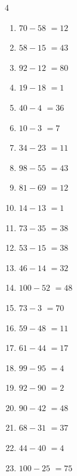\begin{multicols}{4}
\begin{enumerate}
  \item $70-58$
        $=12$

  \item $58-15$
        $=43$

  \item $92-12$
        $=80$

  \item $19-18$
        $=1$

  \item $40-4$
        $=36$

  \item $10-3$
        $=7$

  \item $34-23$
        $=11$

  \item $98-55$
        $=43$

\columnbreak %

  \item $81-69$
        $=12$

  \item $14-13$
        $=1$

  \item $73-35$
        $=38$

  \item $53-15$
        $=38$

  \item $46-14$
        $=32$

  \item $100-52$
        $=48$

  \item $73-3$
        $=70$

  \item $59-48$
        $=11$

  \item $61-44$
        $=17$

  \item $99-95$
        $=4$

  \item $92-90$
        $=2$

  \item $90-42$
        $=48$

  \item $68-31$
        $=37$

  \item $44-40$
        $=4$

  \item $100-25$
        $=75$


\end{enumerate}
\end{multicols}
